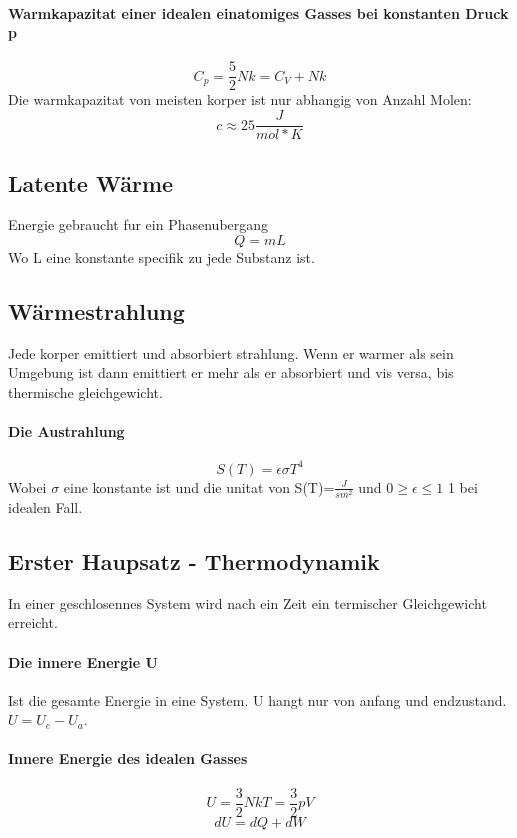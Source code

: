 \documentclass[7pt]{article}
\begin{document}
\begin{multicols*}{3}
\paragraph{Warmkapazitat einer idealen einatomiges Gasses bei konstanten Druck p}
\begin{equation}
	C_p=\frac{5}{2}Nk = C_V+Nk
\end{equation}
Die warmkapazitat von meisten korper ist nur abhangig von Anzahl Molen:
\begin{equation}
	c\approx 25\frac{J}{mol*K}
\end{equation}


\subsection{Latente W{\"a}rme}
Energie gebraucht fur ein Phasenubergang
\begin{equation}
	Q=mL
\end{equation}
Wo L eine konstante specifik zu jede Substanz ist.

\subsection{W{\"a}rmestrahlung}
Jede korper emittiert und absorbiert strahlung. Wenn er warmer als sein Umgebung ist dann emittiert er mehr als er absorbiert und vis versa, bis thermische gleichgewicht.
\paragraph{Die Austrahlung}
\begin{equation}
	S(T)=\epsilon\sigma T^4
\end{equation}
Wobei $\sigma$ eine konstante ist und die unitat von S(T)=$\frac{J}{sm^2}$ und $0\geq\epsilon \leq 1$ 1 bei idealen Fall.

\subsection{Erster Haupsatz - Thermodynamik}
In einer geschlosennes System wird nach ein Zeit ein termischer Gleichgewicht erreicht.
\paragraph{Die innere Energie U}
Ist die gesamte Energie in eine System. U hangt nur von anfang und endzustand. $U = U_e-U_a$.
\paragraph{Innere Energie des idealen Gasses}
\begin{equation}
	U=\frac{3}{2}NkT=\frac{3}{2}pV
\end{equation}
\begin{equation}
	dU=dQ+dW
\end{equation}


\end{multicols*}
\end{document}
